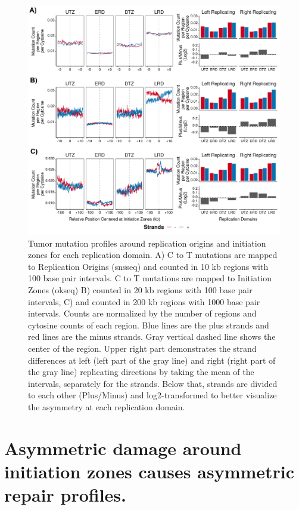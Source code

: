 \begin{figure}[H]
    \begin{center}
    \includegraphics[width=\textwidth]{Chapters/4_results/figures/fig4}
    \caption[Tumor mutation profiles around replication origins and initiation zones for each replication domain.]{Tumor mutation profiles around replication origins and initiation zones for each replication domain. A) C to T mutations are mapped to Replication Origins (\gls{snsseq}) and counted in 10 \gls{kb} regions with 100 base pair intervals. C to T mutations are mapped to Initiation Zones (\gls{okseq}) B) counted in 20 \gls{kb} regions with 100 base pair intervals, C) and counted in 200 \gls{kb} regions with 1000 base pair intervals. Counts are normalized by the number of regions and cytosine counts of each region. Blue lines are the plus strands and red lines are the minus strands. Gray vertical dashed line shows the center of the region. Upper right part demonstrates the strand differences at left (left part of the gray line) and right (right part of the gray line) replicating directions by taking the mean of the intervals, separately for the strands. Below that, strands are divided to each other (Plus/Minus) and log2-transformed to better visualize the asymmetry at each replication domain.}
    \label{fig:mutation}
    \end{center}
    \end{figure}

\section{Asymmetric damage around initiation zones causes asymmetric repair profiles.}

